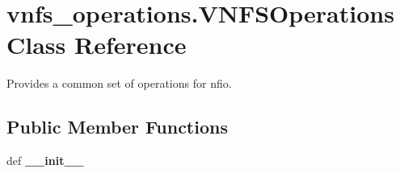 \hypertarget{classvnfs__operations_1_1VNFSOperations}{\section{vnfs\-\_\-operations.\-V\-N\-F\-S\-Operations Class Reference}
\label{classvnfs__operations_1_1VNFSOperations}
}


Provides a common set of operations for nfio.  


\subsection*{Public Member Functions}
\begin{DoxyCompactItemize}
\item 
\hypertarget{classvnfs__operations_1_1VNFSOperations_a8aeb0c031c7f7b97e8544ed7d8c49b35}{def {\bfseries \-\_\-\-\_\-init\-\_\-\-\_\-}}\label{classvnfs__operations_1_1VNFSOperations_a8aeb0c031c7f7b97e8544ed7d8c49b35}


\end{DoxyCompactItemize}
